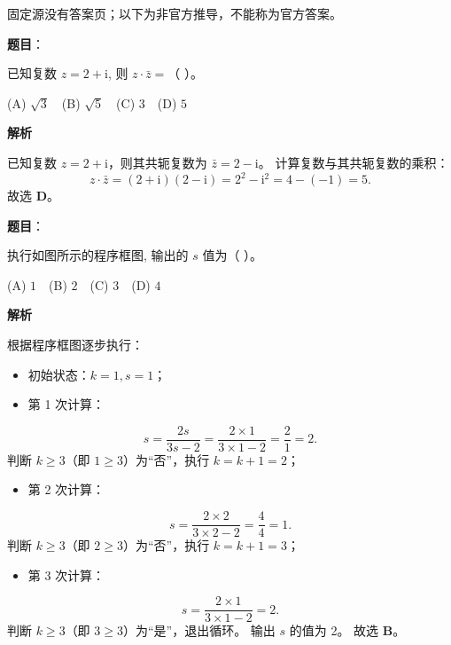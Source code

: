 
\begin{gktip}
固定源没有答案页；以下为非官方推导，不能称为官方答案。
\end{gktip}


\begin{answer}

\textbf{题目}：

已知复数 $z = 2 + \mathrm{i}$, 则 $z \cdot \bar{z} =$（ ）。

(A) $\sqrt{3}$　(B) $\sqrt{5}$　(C) $3$　(D) $5$

\textbf{解析}

已知复数 $z = 2 + \mathrm{i}$，则其共轭复数为 $\bar{z} = 2 - \mathrm{i}$。
计算复数与其共轭复数的乘积：
\nopagebreak[4]
\[z \cdot \bar{z} = (2 + \mathrm{i})(2 - \mathrm{i}) = 2^2 - \mathrm{i}^2 = 4 - (-1) = 5.\]
故选 \textbf{D}。


\end{answer}
\begin{answer}

\textbf{题目}：

执行如图所示的程序框图, 输出的 $s$ 值为（ ）。
\nopagebreak[4]
\begin{center}\end{center}
\nopagebreak[4]
(A) $1$　(B) $2$　(C) $3$　(D) $4$

\textbf{解析}

根据程序框图逐步执行：
\begin{itemize}
\item 初始状态：$k = 1, s = 1$；
\item 第 1 次计算：
\end{itemize}
\nopagebreak[4]
\[s = \frac{2s}{3s - 2} = \frac{2 \times 1}{3 \times 1 - 2} = \frac{2}{1} = 2.\]
  判断 $k \geqslant 3$（即 $1 \geqslant 3$）为“否”，执行 $k = k + 1 = 2$；
\begin{itemize}
\item 第 2 次计算：
\end{itemize}
\nopagebreak[4]
\[s = \frac{2 \times 2}{3 \times 2 - 2} = \frac{4}{4} = 1.\]
  判断 $k \geqslant 3$（即 $2 \geqslant 3$）为“否”，执行 $k = k + 1 = 3$；
\begin{itemize}
\item 第 3 次计算：
\end{itemize}
\nopagebreak[4]
\[s = \frac{2 \times 1}{3 \times 1 - 2} = 2.\]
  判断 $k \geqslant 3$（即 $3 \geqslant 3$）为“是”，退出循环。
输出 $s$ 的值为 2。
故选 \textbf{B}。


\end{answer}
